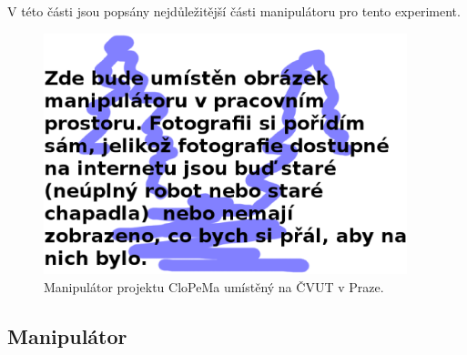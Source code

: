 \documentclass[10pt,a4paper,titlepage,oneside]{report}
\begin{document}
V této části jsou popsány nejdůležitější části manipulátoru pro tento experiment.

\begin{figure}[H]
	\centering  	
  	\includegraphics[height=7cm]{pictures/docasny.eps}
  	\caption[]{Manipulátor projektu CloPeMa umístěný na ČVUT v Praze.}
  	\label{fig:manipulatorCVUT}
\end{figure}

\subsection{Manipulátor}
\label{subsec:manipulator}
\end{document}

